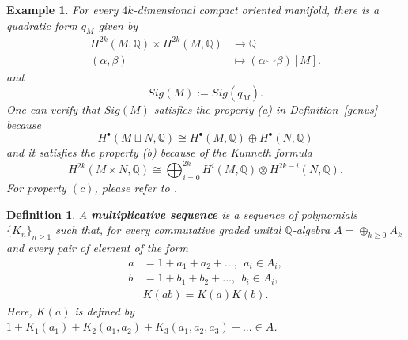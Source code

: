 \documentclass[11pt]{article}
\newtheorem{dfn}[thm]{Definition}
\newtheorem{ex}[thm]{Example}
\newcommand{\ratl}{\mathbb Q}
\begin{document}
 \begin{ex}
 	 For every $4k$-dimensional compact oriented manifold, there is a quadratic form $q_M$ given by
 	 \begin{equation*}
 	 	\begin{aligned}
 	 		H^{2k}(M,\ratl)\times H^{2k}(M,\ratl)& \longrightarrow \ratl\\
 	 		(\alpha,\beta)&\longmapsto (\alpha\smile\beta)[M].
 	 	\end{aligned}
 	 \end{equation*}
 	 and 
 	 \begin{equation*}
 	 	Sig(M):=Sig(q_M).
 	 \end{equation*}
 	 One can verify that $Sig(M)$ satisfies the property (a) in Definition~\ref{genus} because 
 	 \begin{equation*}
 	 	H^\bullet(M\sqcup N,\ratl)\cong H^\bullet(M,\ratl)\oplus H^\bullet(N,\ratl)
 	 \end{equation*}
 	 and it satisfies the property (b) because of the Kunneth formula
 	 \begin{equation*}
 	 	H^{2k}(M\times N,\ratl)\cong\bigoplus^{2k}_{i=0}H^i(M,\ratl)\otimes H^{2k-i}(N,\ratl).
 	 \end{equation*}
 	 For property $(c)$, please refer to \cite{hirzebruch1966topological}.
 \end{ex}

 \begin{dfn}
 	A \textbf{multiplicative sequence} is a sequence of polynomials $\{K_n\}_{n\geq1}$ such that, for every commutative graded unital $\ratl$-algebra $A=\oplus_{k\geq0}A_k$ and every pair of element of the form
 	\begin{equation*}
 		\begin{aligned}
 			a&=1+a_1+a_2+...,\ \ a_i\in A_i,\\
 			b&=1+b_1+b_2+...,\ \ b_i\in A_i,\\
 			&K(ab)=K(a)K(b).
 		\end{aligned}
 	\end{equation*}
 	Here, $K(a)$ is defined by $1+K_1(a_1)+K_2(a_1,a_2)+K_3(a_1,a_2,a_3)+...\in A$.
 \end{dfn}
\end{document}
